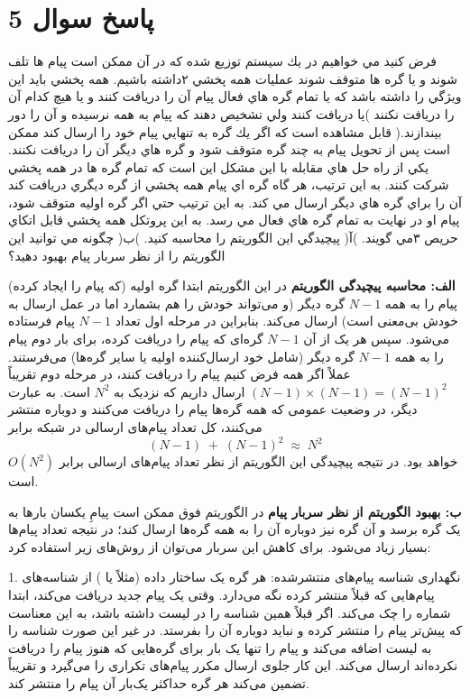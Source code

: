\section*{پاسخ سوال 5}

فرض كنيد مي خواهيم در يك سيستم توزيع شده كه در آن ممكن است پيام ها تلف شوند و يا گره ها متوقف شوند عمليات
همه پخشي  ۲داشته باشيم. همه پخشي بايد اين ويژگي را داشته باشد كه يا تمام گره هاي فعال پيام آن را دريافت كنند و يا هيچ
كدام آن را دريافت نكنند )يا دريافت كنند ولي تشخيص دهند كه پيام به همه نرسيده و آن را دور بيندازند.( قابل مشاهده است
كه اگر يك گره به تنهايي پيام خود را ارسال كند ممكن است پس از تحويل پيام به چند گره متوقف شود و گره هاي ديگر آن را
دريافت نكنند. يكي از راه حل هاي مقابله با اين مشكل اين است كه تمام گره ها در همه پخشي شركت كنند. به اين ترتيب، هر
گاه گره اي پيام همه پخشي از گره ديگري دريافت كند آن را براي گره هاي ديگر ارسال مي كند. به اين ترتيب حتي اگر گره اوليه
متوقف شود، پيام او در نهايت به تمام گره هاي فعال مي رسد. به اين پروتكل همه پخشي قابل اتكاي حريص  ۳مي گويند.
)آ( پيچيدگي اين الگوريتم را محاسبه كنيد.
)ب( چگونه مي توانيد اين الگوريتم را از نظر سربار پيام بهبود دهيد؟

\bigskip

\noindent
\textbf{الف: محاسبه پیچیدگی الگوریتم}  
در این الگوریتم ابتدا گره اولیه (که پیام را ایجاد کرده) پیام را به همه \(N-1\) گره دیگر (و می‌تواند خودش را هم بشمارد اما در عمل ارسال به خودش بی‌معنی است) ارسال می‌کند. بنابراین در مرحله اول تعداد \(N-1\) پیام فرستاده می‌شود. سپس هر یک از آن \(N-1\) گره‌ای که پیام را دریافت کرده، برای بار دوم پیام را به همه \(N-1\) گره دیگر (شامل خود ارسال‌کننده اولیه یا سایر گره‌ها) می‌فرستند. عملاً اگر همه فرض کنیم پیام را دریافت کنند، در مرحله دوم تقریباً \((N-1)\times(N-1) = (N-1)^2\) ارسال داریم که نزدیک به \(N^2\) است. به عبارت دیگر، در وضعیت عمومی که همه گره‌ها پیام را دریافت می‌کنند و دوباره منتشر می‌کنند، کل تعداد پیام‌های ارسالی در شبکه برابر  
\[
(N-1) \;+\; (N-1)^2 \;\approx\; N^2  
\]  
خواهد بود. در نتیجه پیچیدگی این الگوریتم از نظر تعداد پیام‌های ارسالی برابر \(O(N^2)\) است.

\bigskip

\noindent
\textbf{ب: بهبود الگوریتم از نظر سربار پیام}  
در الگوریتم فوق ممکن است پیامِ یکسان بارها به یک گره برسد و آن گره نیز دوباره آن را به همه گره‌ها ارسال کند؛ در نتیجه تعداد پیام‌ها بسیار زیاد می‌شود. برای کاهش این سربار می‌توان از روش‌های زیر استفاده کرد:

1. نگهداری شناسه پیام‌های منتشرشده:  
   هر گره یک ساختار داده (مثلاً  یا ) از شناسه‌های پیام‌هایی که قبلاً منتشر کرده نگه می‌دارد. وقتی یک پیام جدید دریافت می‌کند، ابتدا شماره  را چک می‌کند. اگر قبلاً همین شناسه را در لیست داشته باشد، به این معناست که پیش‌تر پیام را منتشر کرده و نباید دوباره آن را بفرستد. در غیر این صورت شناسه را به لیست اضافه می‌کند و پیام را تنها یک بار برای گره‌هایی که هنوز پیام را دریافت نکرده‌اند ارسال می‌کند. این کار جلوی ارسال مکرر پیام‌های تکراری را می‌گیرد و تقریباً تضمین می‌کند هر گره حداکثر یک‌بار آن پیام را منتشر کند.

